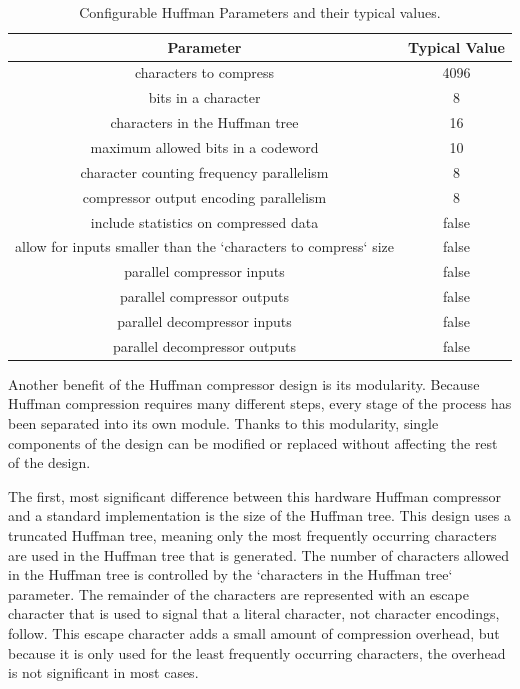 \documentclass[doublespace,nopageskip]{VTthesis}
\begin{document}
\begin{table}[htb]
	\centering
	\caption{Configurable Huffman Parameters and their typical values.}
	\begin{tabular}{cc}
	    \toprule
	    Parameter & Typical Value \\
	    \midrule
	    characters to compress & 4096 \\
	    \midrule
	    bits in a character & 8 \\
	    \midrule
	    characters in the Huffman tree & 16 \\
	    \midrule
	    maximum allowed bits in a codeword & 10 \\
	    \midrule
	    character counting frequency parallelism & 8 \\
	    \midrule
	    compressor output encoding parallelism & 8 \\
	    \midrule
	    include statistics on compressed data & false \\
	    \midrule
	    allow for inputs smaller than the `characters to compress` size & false \\
	    \midrule
	    parallel compressor inputs & false \\
	    \midrule
	    parallel compressor outputs & false \\
	    \midrule
	    parallel decompressor inputs & false \\ 
	    \midrule
	    parallel decompressor outputs & false \\
	    \bottomrule
	\end{tabular}
	\label{tab:huffman-configuration-table}
\end{table}

Another benefit of the Huffman compressor design is its modularity. Because Huffman compression requires many different steps, every stage of the process has been separated into its own module. Thanks to this modularity, single components of the design can be modified or replaced without affecting the rest of the design.

The first, most significant difference between this hardware Huffman compressor and a standard implementation is the size of the Huffman tree. This design uses a truncated Huffman tree, meaning only the most frequently occurring characters are used in the Huffman tree that is generated. The number of characters allowed in the Huffman tree is controlled by the `characters in the Huffman tree` parameter. The remainder of the characters are represented with an escape character that is used to signal that a literal character, not character encodings, follow. This escape character adds a small amount of compression overhead, but because it is only used for the least frequently occurring characters, the overhead is not significant in most cases.
\end{document}
